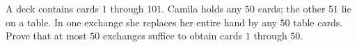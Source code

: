 A deck contains cards $1$ through $101$. Camila holds any $50$ cards; the other $51$ lie on a table. In one exchange she replaces her entire hand by any $50$ table cards. Prove that at most $50$ exchanges suffice to obtain cards $1$ through $50$.
